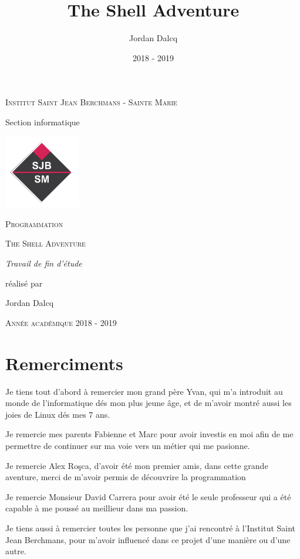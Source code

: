 \documentclass{report}
\begin{document}
\begin{titlepage}
  \centering
  {\scshape Institut Saint Jean Berchmans - Sainte Marie\par\vspace{0.2cm} Section informatique\par \vspace{0.2cm}}
  \vspace{1cm}
  \includegraphics[width=0.25\textwidth]{img/image2}\par\vspace{1cm}
  {\scshape \LARGE Programmation \par}
  \vspace{0.2cm}
	{\scshape \Large The Shell Adventure\par}
  \vspace{3cm}
  {\Large\itshape Travail de fin d'étude \par réalisé par \par Jordan Dalcq \par}
  \vfill
  \scshape Année académique 2018 - 2019
  \title{The Shell Adventure}
  \author{Jordan Dalcq}
  \date{2018 - 2019}
\end{titlepage}

\tableofcontents

\pagestyle{empty}

\part*{Remerciments}

Je tiens tout d'abord à remercier mon grand père Yvan, qui m'a introduit au monde de l'informatique dés mon plus jeune âge, et de m'avoir montré aussi les joies de Linux dés mes 7 ans.
\newline
\par Je remercie mes parents Fabienne et Marc pour avoir investis en moi afin de me permettre de continuer sur ma voie vers un métier qui me pasionne.
\newline
\par Je remercie Alex Roşca, d'avoir été mon premier amis, dans cette grande aventure, merci de m'avoir permis de découvrire la programmation
\newline
\par Je remercie Monsieur David Carrera pour avoir été le seule professeur qui a été capable à me poussé au meillieur dans ma passion.
\newline
\par Je tiens aussi à remercier toutes les personne que j'ai rencontré à l'Institut Saint Jean Berchmans, pour m'avoir influencé dans ce projet d'une manière ou d'une autre.
\end{document}

